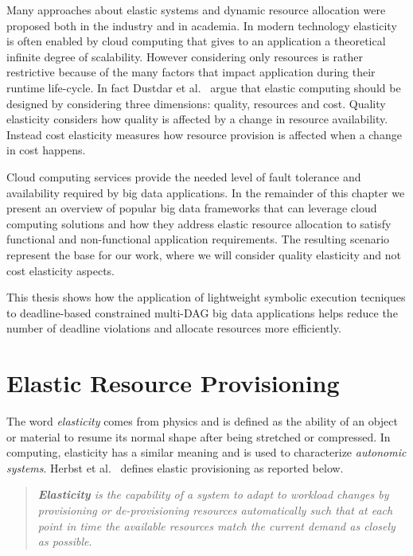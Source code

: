 Many approaches about elastic systems and dynamic resource allocation were proposed both in the industry and in academia. In modern technology elasticity is often enabled by cloud computing that gives to an application a theoretical infinite degree of scalability. However considering only resources is rather restrictive because of the many factors that impact application during their runtime life-cycle. In fact Dustdar et al.~\cite{Dustdar2011} argue that elastic computing should be designed by considering three dimensions: quality, resources and cost.  Quality elasticity considers how quality is affected by a change in resource availability. Instead cost elasticity measures how resource provision is affected when a change in cost happens. 

Cloud computing services provide the needed level of fault tolerance and availability required by big data applications. In the remainder of this chapter we present an overview of popular big data frameworks that can leverage cloud computing solutions and how they address elastic resource allocation to satisfy functional and non-functional application requirements. The resulting scenario represent the base for our work, where we will consider quality elasticity and not cost elasticity aspects. 

This thesis shows how the application of lightweight symbolic execution tecniques to deadline-based \qos constrained multi-DAG big data applications helps reduce the number of deadline violations and allocate resources more efficiently.


\section{Elastic Resource Provisioning}
\label{Section:Introduction:ElasticProvisioning}

The word \textit{elasticity} comes from physics and is defined as the ability of an object or material to resume its normal shape after being stretched or compressed. In computing, elasticity has a similar meaning and is used to characterize \textit{autonomic systems}. Herbst et al.~\cite{Herbst2013} defines elastic provisioning as reported below.
\begin{quote}
	\textit{\textbf{Elasticity} is the capability of a system to adapt to workload changes by provisioning or de-provisioning resources automatically such that at each point in time the available resources match the current demand as closely as possible}.
\end{quote}

